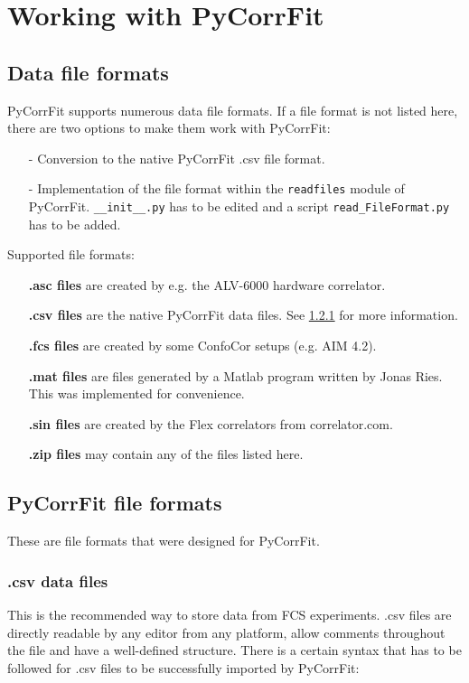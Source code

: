 \section{Working with PyCorrFit}
\subsection{Data file formats}
\label{sec:fileformats}
PyCorrFit supports numerous data file formats. If a file format is not listed here, there are two options to make them work with PyCorrFit:
\begin{itemize}
\item[-] Conversion to the native PyCorrFit \mytilde .csv file format.
\item[-] Implementation of the file format within the \texttt{readfiles} module of PyCorrFit. \texttt{\_\_init\_\_.py} has to be edited and a script \texttt{read\_FileFormat.py} has to be added.
\end{itemize}

Supported file formats:
\begin{itemize}
\item[] \textbf{\mytilde .asc files} are created by e.g. the ALV-6000 hardware correlator.
\item[] \textbf{\mytilde .csv files} are the native PyCorrFit data files. See \ref{text:csv} for more information.
\item[] \textbf{\mytilde .fcs files} are created by some ConfoCor setups (e.g. AIM 4.2).
\item[] \textbf{\mytilde .mat files} are files generated by a Matlab program written by Jonas Ries. This was implemented for convenience.
\item[] \textbf{\mytilde .sin files} are created by the Flex correlators from correlator.com.
\item[] \textbf{\mytilde .zip files} may contain any of the files listed here.
\end{itemize}

\subsection{PyCorrFit file formats}
These are file formats that were designed for PyCorrFit.


\subsubsection{.csv data files}
\label{text:csv}
This is the recommended way to store data from FCS experiments. \mytilde .csv files are directly readable by any editor from any platform, allow comments throughout the file and have a well-defined structure. There is a certain syntax that has to be followed for \mytilde .csv files to be successfully imported by PyCorrFit:


